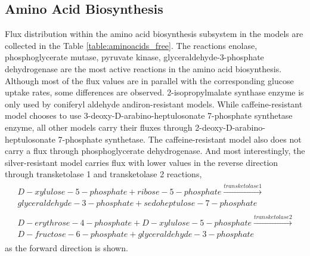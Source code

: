 \vspace{-1cm}

\subsection{Amino Acid Biosynthesis}
Flux distribution within the amino acid biosynthesis subsystem in the models are collected in the Table \ref{table:aminoacids_free}. The reactions enolase, phosphoglycerate mutase, pyruvate kinase, glyceraldehyde-3-phosphate dehydrogenase are the most active reactions in the amino acid biosynthesis. Although most of the flux values are in parallel with the corresponding glucose uptake rates, some differences are observed. 2-isopropylmalate synthase enzyme is only used by coniferyl aldehyde andiron-resistant models. While caffeine-resistant model chooses to use 3-deoxy-D-arabino-heptulosonate 7-phosphate synthetase enzyme, all other models carry their fluxes through 2-deoxy-D-arabino-heptulosonate 7-phosphate synthetase. The caffeine-resistant model also does not carry a flux through phosphoglycerate dehydrogenase. And most interestingly, the silver-resistant model carries flux with lower values in the reverse direction through transketolase 1 and transketolase 2 reactions,
\begin{align}
\begin{split}
\label{eq:transketolase}
\ D-xylulose-5-phosphate + ribose-5-phosphate \xrightarrow{transketolase1} \\
\ glyceraldehyde-3-phosphate + sedoheptulose-7-phosphate \\
\ \\
\ D-erythrose-4-phosphate + D-xylulose-5-phosphate \xrightarrow{transketolase2} \\
\ D-fructose-6-phosphate + glyceraldehyde-3-phosphate
\end{split}
\end{align}
as the forward direction is shown.

\baselineskip


